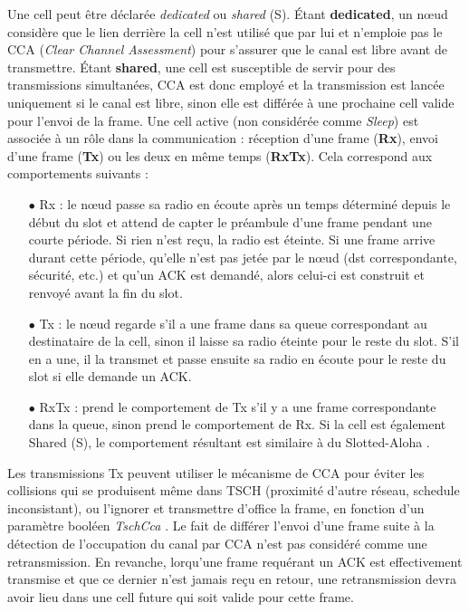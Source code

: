 \documentclass[]{report}
\begin{document}
\par Une cell peut être déclarée \textit{dedicated} ou \textit{shared} (S). Étant \textbf{dedicated}, un nœud considère que le lien derrière la cell n'est utilisé que par lui et n'emploie pas le CCA (\textit{Clear Channel Assessment}) pour s'assurer que le canal est libre avant de transmettre. Étant \textbf{shared}, une cell est susceptible de servir pour des transmissions simultanées, CCA est donc employé et la transmission est lancée uniquement si le canal est libre, sinon elle est différée à une prochaine cell valide pour l'envoi de la frame. Une cell active (non considérée comme \textit{Sleep}) est associée à un rôle dans la communication : réception d'une frame (\textbf{Rx}), envoi d'une frame (\textbf{Tx}) ou les deux en même temps (\textbf{RxTx}). Cela correspond aux comportements suivants :
\vspace{0.2cm}
\begin{itemize}
\item[$\bullet$] Rx : le nœud passe sa radio en écoute après un temps déterminé depuis le début du slot et attend de capter le préambule d'une frame pendant une courte période. Si rien n'est reçu, la radio est éteinte. Si une frame arrive durant cette période, qu'elle n'est pas jetée par le nœud (dst correspondante, sécurité, etc.) et qu'un ACK est demandé, alors celui-ci est construit et renvoyé avant la fin du slot.
\vspace{0.1cm}
\item[$\bullet$] Tx : le nœud regarde s'il a une frame dans sa queue correspondant au destinataire de la cell, sinon il laisse sa radio éteinte pour le reste du slot. S'il en a une, il la transmet et passe ensuite sa radio en écoute pour le reste du slot si elle demande un ACK.
\vspace{0.1cm}
\item[$\bullet$] RxTx : prend le comportement de Tx s'il y a une frame correspondante dans la queue, sinon prend le comportement de Rx. Si la cell est également Shared (S), le comportement résultant est similaire à du Slotted-Aloha \cite{rfc7554}.
\vspace{0.1cm}
\end{itemize}

\newpage

\par Les transmissions Tx peuvent utiliser le mécanisme de CCA pour éviter les collisions qui se produisent même dans TSCH (proximité d'autre réseau, schedule inconsistant), ou l'ignorer et transmettre d'office la frame, en fonction d'un paramètre booléen \textit{TschCca} \cite{IEEE802.15.4}. Le fait de différer l'envoi d'une frame suite à la détection de l'occupation du canal par CCA n'est pas considéré comme une retransmission. En revanche, lorqu'une frame requérant un ACK est effectivement transmise et que ce dernier n'est jamais reçu en retour, une retransmission devra avoir lieu dans une cell future qui soit valide pour cette frame.\\
\end{document}
